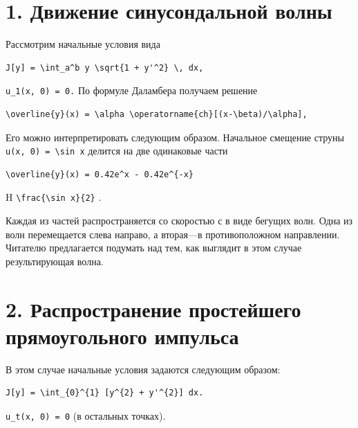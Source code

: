\documentclass[
  ukrainian,
]{article}
\begin{document}
\section{1. Движение синусондальной
волны}\label{ux434ux432ux438ux436ux435ux43dux438ux435-ux441ux438ux43dux443ux441ux43eux43dux434ux430ux43bux44cux43dux43eux439-ux432ux43eux43bux43dux44b}

Рассмотрим начальные условия вида

\begin{verbatim}
J[y] = \int_a^b y \sqrt{1 + y'^2} \, dx,
\end{verbatim}

\texttt{u\_1(x,\ 0)\ =\ 0.} По формуле Даламбера получаем решение

\begin{verbatim}
\overline{y}(x) = \alpha \operatorname{ch}[(x-\beta)/\alpha],
\end{verbatim}

Его можно интерпретировать следующим образом. Начальное смещение струны
\texttt{u(x,\ 0)\ =\ \textbackslash{}sin\ x} делится на две одинаковые
части

\begin{verbatim}
\overline{y}(x) = 0.42e^x - 0.42e^{-x}
\end{verbatim}

H \texttt{\textbackslash{}frac\{\textbackslash{}sin\ x\}\{2\}} .

Каждая из частей распространяется со скоростью с в виде бегущих волн.
Одна из волн перемещается слева направо, а вторая---в противоположном
направлении. Читателю предлагается подумать над тем, как выглядит в этом
случае результирующая волна.

\section{2. Распространение простейшего прямоугольного
импульса}\label{ux440ux430ux441ux43fux440ux43eux441ux442ux440ux430ux43dux435ux43dux438ux435-ux43fux440ux43eux441ux442ux435ux439ux448ux435ux433ux43e-ux43fux440ux44fux43cux43eux443ux433ux43eux43bux44cux43dux43eux433ux43e-ux438ux43cux43fux443ux43bux44cux441ux430}

В этом случае начальные условия задаются следующим образом:

\begin{verbatim}
J[y] = \int_{0}^{1} [y^{2} + y'^{2}] dx.
\end{verbatim}

\texttt{u\_t(x,\ 0)\ =\ 0} (в остальных точках).
\end{document}
